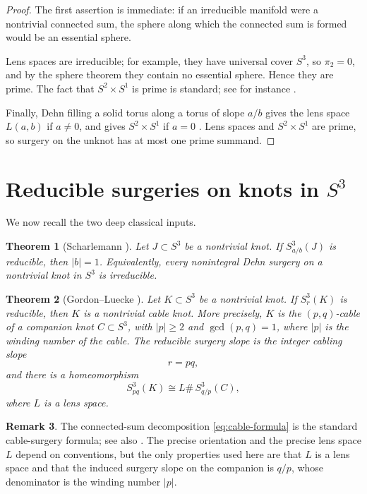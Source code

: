 \documentclass[11pt]{article}
\theoremstyle{plain}
\newtheorem{theorem}{Theorem}[section]
\theoremstyle{definition}
\newtheorem{remark}[theorem]{Remark}
\numberwithin{equation}{section}
\begin{document}
\begin{proof}
The first assertion is immediate: if an irreducible manifold were a nontrivial connected sum, the sphere along which the connected sum is formed would be an essential sphere.

Lens spaces are irreducible; for example, they have universal cover $S^3$, so $\pi_2=0$, and by the sphere theorem they contain no essential sphere.  Hence they are prime.  The fact that $S^2\times S^1$ is prime is standard; see for instance \cite{Hempel}.

Finally, Dehn filling a solid torus along a torus of slope $a/b$ gives the lens space $L(a,b)$ if $a\ne 0$, and gives $S^2\times S^1$ if $a=0$ \cite{Rolfsen}.  Lens spaces and $S^2\times S^1$ are prime, so surgery on the unknot has at most one prime summand.
\end{proof}

\section{Reducible surgeries on knots in $S^3$}

We now recall the two deep classical inputs.

\begin{theorem}[Scharlemann {\cite{Sch}}]\label{thm:Scharlemann}
Let $J\subset S^3$ be a nontrivial knot.  If $S^3_{a/b}(J)$ is reducible, then $|b|=1$.  Equivalently, every nonintegral Dehn surgery on a nontrivial knot in $S^3$ is irreducible.
\end{theorem}

\begin{theorem}[Gordon--Luecke {\cite{GL}}]\label{thm:GL}
Let $K\subset S^3$ be a nontrivial knot.  If $S^3_r(K)$ is reducible, then $K$ is a nontrivial cable knot.  More precisely, $K$ is the $(p,q)$-cable of a companion knot $C\subset S^3$, with $|p|\ge 2$ and $\gcd(p,q)=1$, where $|p|$ is the winding number of the cable.  The reducible surgery slope is the integer cabling slope
\[
r=pq,
\]
and there is a homeomorphism
\begin{equation}\label{eq:cable-formula}
S^3_{pq}(K)\cong L\#\, S^3_{q/p}(C),
\end{equation}
where $L$ is a lens space.
\end{theorem}

\begin{remark}
The connected-sum decomposition \eqref{eq:cable-formula} is the standard cable-surgery formula; see also \cite{Rolfsen}.  The precise orientation and the precise lens space $L$ depend on conventions, but the only properties used here are that $L$ is a lens space and that the induced surgery slope on the companion is $q/p$, whose denominator is the winding number $|p|$.
\end{remark}
\end{document}
